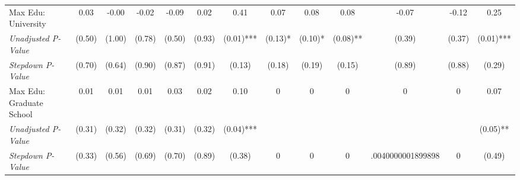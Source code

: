 \begin{tabular}{l c c c c c c c c c c c c}
Max Edu: University & 0.03 & -0.00 & -0.02 & -0.09 & 0.02 & 0.41 & 0.07 & 0.08 & 0.08 & -0.07 & -0.12 & 0.25 \\
\quad \textit{Unadjusted P-Value} & (0.50) & (1.00) & (0.78) & (0.50) & (0.93) & (0.01)*** & (0.13)* & (0.10)* & (0.08)** & (0.39) & (0.37) & (0.01)*** \\
\quad \textit{Stepdown P-Value} & (0.70) & (0.64) & (0.90) & (0.87) & (0.91) & (0.13) & (0.18) & (0.19) & (0.15) & (0.89) & (0.88) & (0.29) \\
Max Edu: Graduate School & 0.01 & 0.01 & 0.01 & 0.03 & 0.02 & 0.10 & 0 & 0 & 0 & 0 & 0 & 0.07 \\
\quad \textit{Unadjusted P-Value} & (0.31) & (0.32) & (0.32) & (0.31) & (0.32) & (0.04)*** & & & & & & (0.05)** \\
\quad \textit{Stepdown P-Value} & (0.33) & (0.56) & (0.69) & (0.70) & (0.89) & (0.38) & 0 & 0 & 0 & .0040000001899898 & 0 & (0.49) \\
\bottomrule
\end{tabular}
